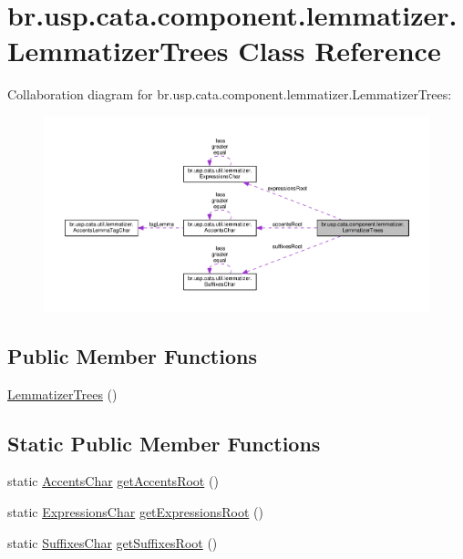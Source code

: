 \hypertarget{classbr_1_1usp_1_1cata_1_1component_1_1lemmatizer_1_1_lemmatizer_trees}{\section{br.\+usp.\+cata.\+component.\+lemmatizer.\+Lemmatizer\+Trees Class Reference}
\label{classbr_1_1usp_1_1cata_1_1component_1_1lemmatizer_1_1_lemmatizer_trees}
}


Collaboration diagram for br.\+usp.\+cata.\+component.\+lemmatizer.\+Lemmatizer\+Trees\+:\nopagebreak
\begin{figure}[H]
\begin{center}
\leavevmode
\includegraphics[width=350pt]{classbr_1_1usp_1_1cata_1_1component_1_1lemmatizer_1_1_lemmatizer_trees__coll__graph}
\end{center}
\end{figure}
\subsection*{Public Member Functions}
\begin{DoxyCompactItemize}
\item 
\hyperlink{classbr_1_1usp_1_1cata_1_1component_1_1lemmatizer_1_1_lemmatizer_trees_a02014a56727ee3b28a74e3375cdd27b9}{Lemmatizer\+Trees} ()
\end{DoxyCompactItemize}
\subsection*{Static Public Member Functions}
\begin{DoxyCompactItemize}
\item 
static \hyperlink{classbr_1_1usp_1_1cata_1_1util_1_1lemmatizer_1_1_accents_char}{Accents\+Char} \hyperlink{classbr_1_1usp_1_1cata_1_1component_1_1lemmatizer_1_1_lemmatizer_trees_a0a51000da4da886e37d9c9787131431d}{get\+Accents\+Root} ()
\item 
static \hyperlink{classbr_1_1usp_1_1cata_1_1util_1_1lemmatizer_1_1_expressions_char}{Expressions\+Char} \hyperlink{classbr_1_1usp_1_1cata_1_1component_1_1lemmatizer_1_1_lemmatizer_trees_a736ec8b8f6ee1d7faf14d23f6ebe3046}{get\+Expressions\+Root} ()
\item 
static \hyperlink{classbr_1_1usp_1_1cata_1_1util_1_1lemmatizer_1_1_suffixes_char}{Suffixes\+Char} \hyperlink{classbr_1_1usp_1_1cata_1_1component_1_1lemmatizer_1_1_lemmatizer_trees_ab32413f5083ef074bd786247d2626219}{get\+Suffixes\+Root} ()
\end{DoxyCompactItemize}
